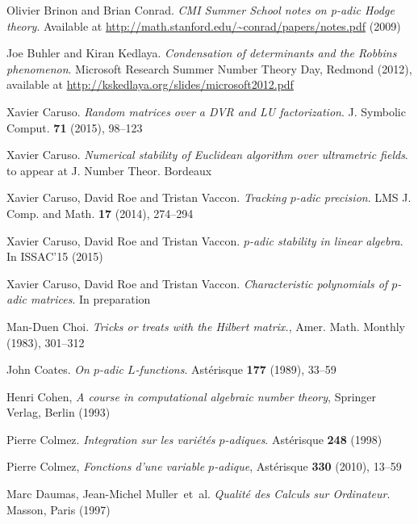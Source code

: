 \documentclass[11pt]{article}
\numberwithin{equation}{section}
\numberwithin{figure}{section}
\theoremstyle{definition}
\begin{document}
\begin{thebibliography}{99}

  Olivier Brinon and Brian Conrad.
  \emph{CMI Summer School notes on p-adic Hodge theory}.
  Available at \url{http://math.stanford.edu/~conrad/papers/notes.pdf} (2009)

  Joe Buhler and Kiran Kedlaya.
  \emph{Condensation of determinants and the Robbins phenomenon}.
  Microsoft Research Summer Number Theory Day, Redmond (2012),
  available at \url{http://kskedlaya.org/slides/microsoft2012.pdf}

  Xavier Caruso.
  \emph{Random matrices over a DVR and LU factorization}.
  J. Symbolic Comput. \textbf{71} (2015), 98--123

  Xavier Caruso.
  \emph{Numerical stability of Euclidean algorithm over ultrametric fields}.
  to appear at J. Number Theor. Bordeaux

  Xavier Caruso, David Roe and Tristan Vaccon.
  \emph{Tracking $p$-adic precision}.
  LMS J. Comp. and Math. {\bf 17} (2014), 274--294

  Xavier Caruso, David Roe and Tristan Vaccon.
  \emph{$p$-adic stability in linear algebra}.
  In ISSAC'15 (2015)

  Xavier Caruso, David Roe and Tristan Vaccon.
  \emph{Characteristic polynomials of $p$-adic matrices}.
  In preparation

  Man-Duen Choi. 
  \emph{Tricks or treats with the Hilbert matrix.},
  Amer. Math. Monthly (1983), 301--312

  John Coates.
  \emph{On $p$-adic $L$-functions}.
  Astérisque \textbf{177} (1989), 33--59

  Henri Cohen,
  \emph{A course in computational algebraic number theory},
  Springer Verlag, Berlin (1993)

  Pierre Colmez.
  \emph{Integration sur les variétés $p$-adiques}.
  Astérisque \textbf{248} (1998)

  Pierre Colmez,
  \emph{Fonctions d'une variable $p$-adique},
  Astérisque \textbf{330} (2010), 13--59

  Marc Daumas, Jean-Michel Muller~et~al.
  \emph{Qualité des Calculs sur Ordinateur}.
  Masson, Paris (1997)


\end{thebibliography}
\end{document}
